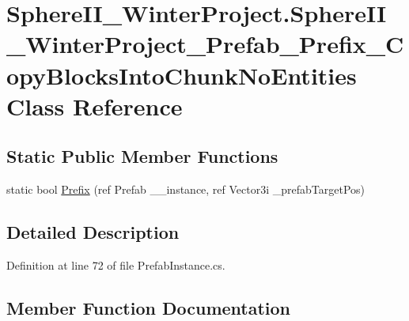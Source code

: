 \hypertarget{class_sphere_i_i___winter_project_1_1_sphere_i_i___winter_project___prefab___prefix___copy_blocks_into_chunk_no_entities}{}\section{Sphere\+I\+I\+\_\+\+Winter\+Project.\+Sphere\+I\+I\+\_\+\+Winter\+Project\+\_\+\+Prefab\+\_\+\+Prefix\+\_\+\+Copy\+Blocks\+Into\+Chunk\+No\+Entities Class Reference}
\label{class_sphere_i_i___winter_project_1_1_sphere_i_i___winter_project___prefab___prefix___copy_blocks_into_chunk_no_entities}
\subsection*{Static Public Member Functions}
\begin{DoxyCompactItemize}
\item 
static bool \mbox{\hyperlink{class_sphere_i_i___winter_project_1_1_sphere_i_i___winter_project___prefab___prefix___copy_blocks_into_chunk_no_entities_ad00f9e4d1929baaba742832ee4d34683}{Prefix}} (ref Prefab \+\_\+\+\_\+instance, ref Vector3i \+\_\+prefab\+Target\+Pos)
\end{DoxyCompactItemize}


\subsection{Detailed Description}


Definition at line 72 of file Prefab\+Instance.\+cs.



\subsection{Member Function Documentation}
\mbox{\label{class_sphere_i_i___winter_project_1_1_sphere_i_i___winter_project___prefab___prefix___copy_blocks_into_chunk_no_entities_ad00f9e4d1929baaba742832ee4d34683}} 
